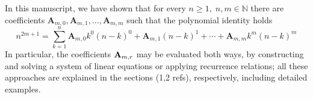 In this manuscript, we have shown that for every $n\geq 1, \; n,m\in\mathbb{N}$
there are coefficients $\mathbf{A}_{m,0}, \mathbf{A}_{m,1}, \ldots, \mathbf{A}_{m,m}$ such that
the polynomial identity holds
\[
    n^{2m+1} = \sum_{k=1}^{n} \mathbf{A}_{m,0} k^0 (n-k)^0 + \mathbf{A}_{m,1}(n-k)^1
    + \cdots + \mathbf{A}_{m,m} k^m (n-k)^m
\]
In particular, the coefficients ${\mathbf{A}} \sb{m,r}$ may be evaluated both ways,
by constructing and solving a system of linear equations or applying recurrence relations;
all these approaches are explained in the sections (1,2 refs), respectively, including detailed examples.
